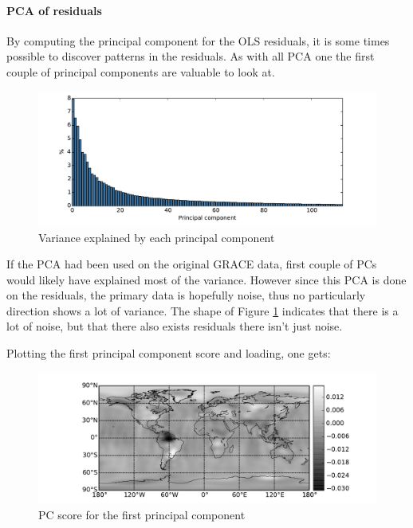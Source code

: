 \paragraph{PCA of residuals}

By computing the principal component for the OLS residuals, it is some times possible to discover patterns in the residuals. As with all PCA one the first couple of principal components are valuable to look at.
\begin{figure}[H]
\centering
\includegraphics[width=1.0\textwidth]{figures/ols-pca-explained}
\caption{Variance explained by each principal component}
\label{fig:ols-pca-explained}
\end{figure}

If the PCA had been used on the original GRACE data, first couple of PCs would likely have explained most of the variance. However since this PCA is done on the residuals, the primary data is hopefully noise, thus no particularly direction shows a lot of variance. The shape of Figure \ref{fig:ols-pca-explained} indicates that there is a lot of noise, but that there also exists residuals there isn't just noise.

Plotting the first principal component score and loading, one gets:
\begin{figure}[H]
\centering
\includegraphics[width=1.0\textwidth]{figures/ols-pca-score-0}
\caption{PC score for the first principal component}
\label{fig:ols-pca-score-0}
\end{figure}

